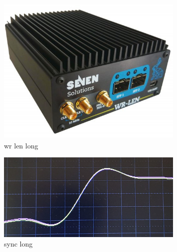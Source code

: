 \begin{figure} %
    \includegraphics[width=0.8\textwidth]{diagrams/5-daq/wr_len.jpg}
    \caption[wr len short]
    {wr len long}
    \label{fig:wr_len}
\end{figure} %

\begin{figure} %
    \includegraphics[width=0.8\textwidth]{diagrams/5-daq/sync.jpg}
    \caption[sync short]
    {sync long}
    \label{fig:sync}
\end{figure} %

